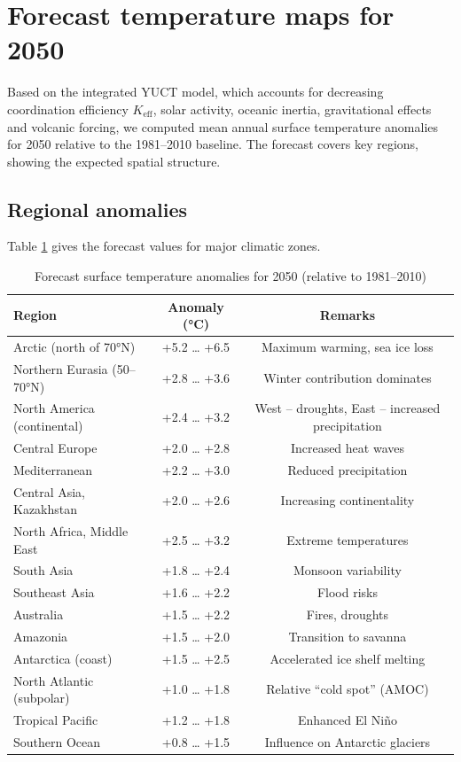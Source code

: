 \documentclass[12pt,a4paper]{article}
\begin{document}
	\section{Forecast temperature maps for 2050}
	\label{sec:forecast_maps}
	
	Based on the integrated YUCT model, which accounts for decreasing coordination efficiency \(K_{\mathrm{eff}}\), solar activity, oceanic inertia, gravitational effects and volcanic forcing, we computed mean annual surface temperature anomalies for 2050 relative to the 1981–2010 baseline. The forecast covers key regions, showing the expected spatial structure.
	
	\subsection{Regional anomalies}
	
	Table \ref{tab:anomalies_2050} gives the forecast values for major climatic zones.
	
	\begin{table}[htbp]
		\centering
		\caption{Forecast surface temperature anomalies for 2050 (relative to 1981–2010)}
		\label{tab:anomalies_2050}
		\small
		\begin{tabular}{p{4.5cm} c c}
			\toprule
			Region & Anomaly (°C) & Remarks \\
			\midrule
			Arctic (north of 70°N) & +5.2 … +6.5 & Maximum warming, sea ice loss \\
			Northern Eurasia (50–70°N) & +2.8 … +3.6 & Winter contribution dominates \\
			North America (continental) & +2.4 … +3.2 & West – droughts, East – increased precipitation \\
			Central Europe & +2.0 … +2.8 & Increased heat waves \\
			Mediterranean & +2.2 … +3.0 & Reduced precipitation \\
			Central Asia, Kazakhstan & +2.0 … +2.6 & Increasing continentality \\
			North Africa, Middle East & +2.5 … +3.2 & Extreme temperatures \\
			South Asia & +1.8 … +2.4 & Monsoon variability \\
			Southeast Asia & +1.6 … +2.2 & Flood risks \\
			Australia & +1.5 … +2.2 & Fires, droughts \\
			Amazonia & +1.5 … +2.0 & Transition to savanna \\
			Antarctica (coast) & +1.5 … +2.5 & Accelerated ice shelf melting \\
			North Atlantic (subpolar) & +1.0 … +1.8 & Relative “cold spot” (AMOC) \\
			Tropical Pacific & +1.2 … +1.8 & Enhanced El Niño \\
			Southern Ocean & +0.8 … +1.5 & Influence on Antarctic glaciers \\
			\bottomrule
		\end{tabular}
	\end{table}
	
\end{document}
